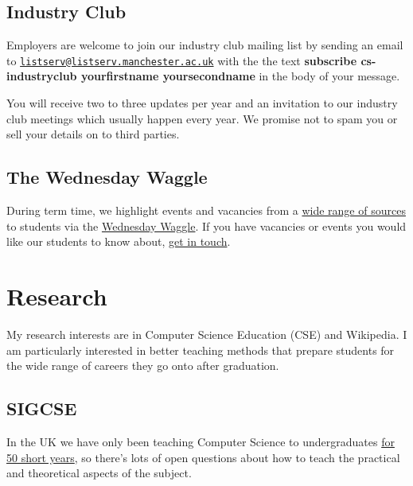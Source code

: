 \documentclass[12pt,]{book}
\begin{document}
\hypertarget{industry-club}{%
\section{Industry Club}\label{industry-club}}

Employers are welcome to join our industry club mailing list by sending an email to \href{mailto:listserv@listserv.manchester.ac.uk}{\nolinkurl{listserv@listserv.manchester.ac.uk}} with the the text \textbf{subscribe cs-industryclub yourfirstname yoursecondname} in the body of your message.

You will receive two to three updates per year and an invitation to our industry club meetings which usually happen every year. We promise not to spam you or sell your details on to third parties.

\hypertarget{the-wednesday-waggle}{%
\section{The Wednesday Waggle}\label{the-wednesday-waggle}}

During term time, we highlight events and vacancies from a \href{http://dullhunk.github.io/where-can-I-look-for-jobs.html}{wide range of sources} to students via the \href{https://waggle.cs.manchester.ac.uk/waggle/about}{Wednesday Waggle}. If you have vacancies or events you would like our students to know about, \protect\hyperlink{contact}{get in touch}.

\hypertarget{research}{%
\chapter{Research}\label{research}}

My research interests are in Computer Science Education (CSE) and Wikipedia. I am particularly interested in better teaching methods that prepare students for the wide range of careers they go onto after graduation.

\hypertarget{sigcse}{%
\section{SIGCSE}\label{sigcse}}

In the UK we have only been teaching Computer Science to undergraduates \href{http://www.bbc.co.uk/manchester/content/articles/2005/11/07/baby_computer_40_interview_feature.shtml}{for 50 short years}, so there's lots of open questions about how to teach the practical and theoretical aspects of the subject.
\end{document}
